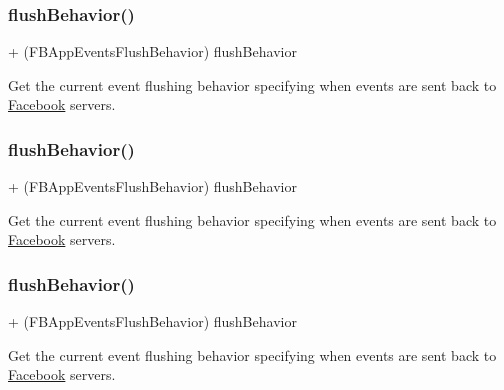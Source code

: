 \subsubsection{\texorpdfstring{flush\+Behavior()}{flushBehavior()}\hspace{0.1cm}{\footnotesize\ttfamily [2/5]}}
{\footnotesize\ttfamily + (F\+B\+App\+Events\+Flush\+Behavior) flush\+Behavior \begin{DoxyParamCaption}{ }\end{DoxyParamCaption}}

Get the current event flushing behavior specifying when events are sent back to \hyperlink{interfaceFacebook}{Facebook} servers. \mbox{\label{interfaceFBAppEvents_af9b7ac67d5b3587f7dc452ba2129fe85}} 
\subsubsection{\texorpdfstring{flush\+Behavior()}{flushBehavior()}\hspace{0.1cm}{\footnotesize\ttfamily [3/5]}}
{\footnotesize\ttfamily + (F\+B\+App\+Events\+Flush\+Behavior) flush\+Behavior \begin{DoxyParamCaption}{ }\end{DoxyParamCaption}}

Get the current event flushing behavior specifying when events are sent back to \hyperlink{interfaceFacebook}{Facebook} servers. \mbox{\label{interfaceFBAppEvents_af9b7ac67d5b3587f7dc452ba2129fe85}} 
\subsubsection{\texorpdfstring{flush\+Behavior()}{flushBehavior()}\hspace{0.1cm}{\footnotesize\ttfamily [4/5]}}
{\footnotesize\ttfamily + (F\+B\+App\+Events\+Flush\+Behavior) flush\+Behavior \begin{DoxyParamCaption}{ }\end{DoxyParamCaption}}

Get the current event flushing behavior specifying when events are sent back to \hyperlink{interfaceFacebook}{Facebook} servers. \mbox{\label{interfaceFBAppEvents_af9b7ac67d5b3587f7dc452ba2129fe85}} 
